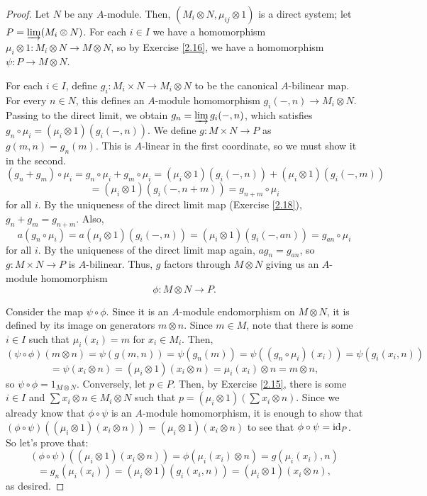\begin{proof}
Let $N$ be any $A$-module. Then, $(M_i \otimes N, \mu_{ij} \otimes 1)$ is a direct system; let $P = \varinjlim(M_i \otimes N)$. For
each $i \in I$ we have a homomorphism $\mu_i \otimes 1 : M_i \otimes N \to M \otimes N$, so by Exercise \ref{2.16}, we have a homomorphism
$\psi : P \to M \otimes N$.

For each $i \in I$, define $g_i : M_i \times N \to M_i \otimes N$ to be the canonical $A$-bilinear map. For every $n \in N$, this defines an
$A$-module homomorphism $g_i(-,n) \to M_i \otimes N$. Passing to the direct limit, we obtain $g_n = \varinjlim g_i(-,n)$, which satisfies
$g_n \circ \mu_i = (\mu_i \otimes 1)(g_i(-,n))$. We define $g : M \times N \to P$ as $g(m,n) = g_n(m)$. This is $A$-linear in the first coordinate, so we must show 
it in the second. 
$$(g_n + g_m)\circ \mu_i = g_n \circ \mu_i + g_m \circ \mu_i = (\mu_i \otimes 1)(g_i(-,n)) + (\mu_i \otimes 1)(g_i(-,m))$$
$$= (\mu_i \otimes 1)(g_i(-,n+m)) = g_{n+m}\circ \mu_i$$
for all $i$. By the uniqueness of the direct limit map (Exercise \ref{2.18}), $g_n + g_m = g_{n+m}$. Also,
$$a(g_n \circ \mu_i) = a (\mu_i \otimes 1)(g_i(-,n)) = (\mu_i \otimes 1)(g_i(-,an)) = g_{an} \circ \mu_i$$
for all $i$. By the uniqueness of the direct limit map again, $a g_n = g_{an}$, so $g : M \times N \to P$ is $A$-bilinear. Thus, $g$ factors through $M \otimes N$
giving us an $A$-module homomorphism
$$\phi : M \otimes N \to P.$$

Consider the map $\psi \circ \phi$. Since it is an $A$-module endomorphism on $M \otimes N$, it is defined by its image on generators $m \otimes n$. Since $m \in M$, note
that there is some $i \in I$ such that $\mu_i(x_i) = m$ for $x_i \in M_i$. Then,
$$(\psi \circ \phi)(m \otimes n) = \psi(g(m,n)) = \psi(g_n(m)) = \psi((g_n \circ \mu_i)(x_i)) = \psi(g_i(x_i,n))$$ 
$$= \psi(x_i \otimes n) = (\mu_i \otimes 1)(x_i \otimes n) = \mu_i(x_i) \otimes n = m \otimes n,$$
so $\psi \circ \phi = 1_{M\otimes N}$. Conversely, let $p \in P$. Then, by Exercise \ref{2.15}, there is some $i \in I$ and $\sum x_i \otimes n \in M_i \otimes N$ such that
$p = (\mu_i \otimes 1)\left(\sum x_i \otimes n \right)$. Since we already know that $\phi \circ \psi$ is an $A$-module homomorphism, it is enough to show that
$(\phi \circ \psi)((\mu_i\otimes 1)(x_i \otimes n)) = (\mu_i \otimes 1)(x_i \otimes n)$ to see that $\phi \circ \psi = \operatorname{id}_P$. So let's prove that:
$$(\phi \circ \psi)((\mu_i\otimes 1)(x_i \otimes n)) = \phi(\mu_i(x_i) \otimes n) = g(\mu_i(x_i),n)$$
$$= g_n(\mu_i(x_i)) = (\mu_i \otimes 1)(g_i(x_i,n)) = (\mu_i \otimes 1)(x_i \otimes n),$$
as desired.
\end{proof}


